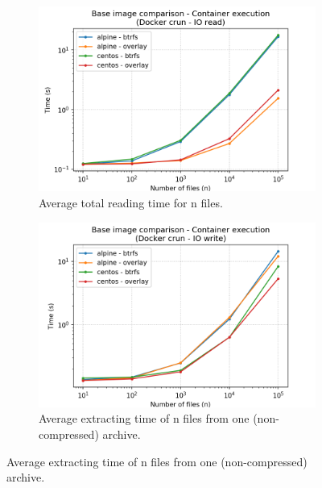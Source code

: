 \begin{figure}[!h]
    \begin{subfigure}{.5\textwidth}
      \centering
      \includegraphics[width=\linewidth]{images/image/image-execution-Docker-crun---IO-read.png}
      \caption{Average total reading time for n files.}
      \label{fig:image:io-read-exec}
    \end{subfigure}
    \begin{subfigure}{.5\textwidth}
      \centering
      \includegraphics[width=\linewidth]{images/image/image-execution-Docker-crun---IO-write.png}
      \caption{Average extracting time of n files from one (non-compressed) archive.}
      \label{fig:image:io-write-exec}
    \end{subfigure}
    

\end{figure}
